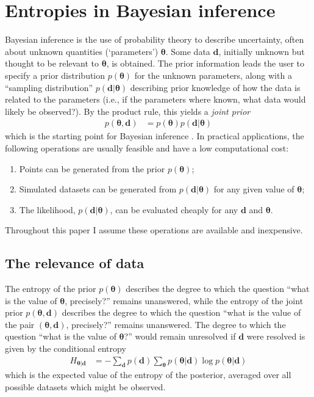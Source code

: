 \documentclass[entropy,article,accept,oneauthor,pdftex,10pt,a4paper]{mdpi}
\renewcommand{\d}{\boldsymbol{d}}
\newcommand{\x}{\boldsymbol{\theta}}
\begin{document}
\section{Entropies in Bayesian inference}

Bayesian inference is the use of probability theory to
describe uncertainty, often about unknown quantities
(`parameters') $\x$. Some data $\d$, initially unknown but
thought to be relevant to $\x$, is obtained.
The prior information leads the
user to specify a prior distribution $p(\x)$ for the unknown parameters,
along with a ``sampling distribution'' $p(\d | \x)$ describing prior knowledge
of how the data is related to the parameters
(i.e., if the parameters where known, what data would likely be observed?).
By the product rule, this yields a {\em joint prior}
\begin{align}
p(\x, \d) &= p(\x)p(\d | \x)
\end{align}
which is the starting point for
Bayesian inference \citep{caticha2008lectures}.
In practical applications, the following operations
are usually feasible and have a low computational cost:
\begin{enumerate}
  \item Points can be generated from the prior $p(\x)$;
  \item Simulated datasets can be generated from $p(\d | \x)$ for any
        given value of $\x$;
  \item The likelihood, $p(\d | \x)$, can be evaluated cheaply for any
        $\d$ and $\x$.
\end{enumerate}
Throughout this paper I assume these operations are available and inexpensive.

\subsection{The relevance of data}

The entropy of the prior $p(\x)$ describes the degree to which the question
``what is the value of $\x$, precisely?'' remains unanswered, while the
entropy of the joint prior $p(\x, \d)$
describes the degree to which the question
``what is the value of the pair $(\x, \d)$, precisely?'' remains unanswered.
The degree to which the question ``what is the value of $\x$?'' would remain
unresolved if $\d$ were resolved is given by the
conditional entropy
\begin{align}
H_{\x | \d} &= - \sum_{\d} p(\d) \sum_{\x} p(\x | \d) \log p(\x | \d)
\end{align}
which is the expected value of the entropy of the posterior, averaged over
all possible datasets which might be observed. 
\end{document}
